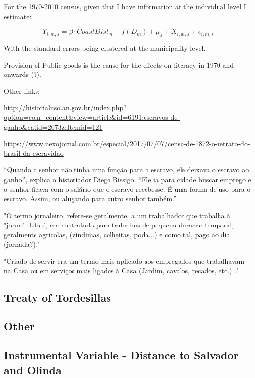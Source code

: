 \documentclass{article}
\begin{document}
For the 1970-2010 census, given that I have information at the individual level I estimate:

\begin{equation}
  Y_{i,m,s} = \beta \cdot CoastDist_{m} + f(D_{m})+ \mu_s + X_{i,m,s} + \epsilon_{i,m,s}
\end{equation}

With the standard errors being clustered at the municipality level. 


Provision of Public goods is the cause for the effects on literacy in 1970 and onwards (?).

Other links:

\url{http://historialuso.an.gov.br/index.php?option=com_content&view=article&id=6191:escravos-de-ganho&catid=2073&Itemid=121}

\url{https://www.nexojornal.com.br/especial/2017/07/07/censo-de-1872-o-retrato-do-brasil-da-escravidao}

“Quando o senhor não tinha uma função para o escravo, ele deixava o escravo ao ganho”, explica o historiador Diego Bissigo. “Ele ia para cidade buscar emprego e o senhor ficava com o salário que o escravo recebesse. É uma forma de uso para o escravo. Assim, ou alugando para outro senhor também.”

"O termo jornaleiro, refere-se geralmente, a um trabalhador que trabalha à "jorna". Isto é, era contratado para trabalhos de pequena duracao temporal, geralmente agricolas, (vindimas, colheitas, poda...) e como tal, pago ao dia (jornada?)."

"Criado de servir era um termo mais aplicado aos empregados que trabalhavam na Casa ou em serviços mais ligados à Casa (Jardim, cavalos, recados, etc.) ."

\parencite[p.~142]{De_Oliveira_Andrade1980-xz}

\subsection{Treaty of Tordesillas}

\subsection{Other}

\subsection{Instrumental Variable - Distance to Salvador and Olinda}
\end{document}
